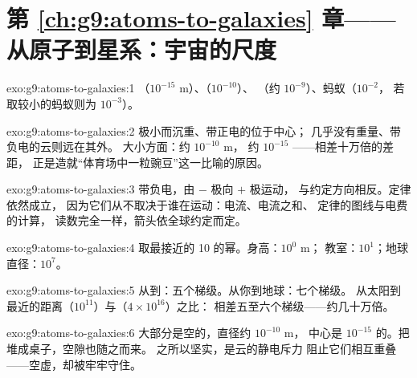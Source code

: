 \section*{第 \ref{ch:g9:atoms-to-galaxies} 章——从原子到星系：宇宙的尺度}

\begin{solution}{exo:g9:atoms-to-galaxies:1}
（$10^{-15}$ \unit{m}）、（$10^{-10}$）、
（约 $10^{-9}$）、蚂蚁（$10^{-2}$，
若取较小的蚂蚁则为 $10^{-3}$）。
\end{solution}

\begin{solution}{exo:g9:atoms-to-galaxies:2}
极小而沉重、带正电的位于中心；
几乎没有重量、带负电的云则远在其外。
大小方面：约 $10^{-10}$ \unit{m}，
约 $10^{-15}$ ——相差十万倍的差距，
正是造就“体育场中一粒豌豆”这一比喻的原因。
\end{solution}

\begin{solution}{exo:g9:atoms-to-galaxies:3}
带负电，由 $-$ 极向 $+$ 极运动，
与约定方向相反。定律依然成立，
因为它们从不取决于谁在运动：电流、电流之和、
定律的图线与电费的计算，
读数完全一样，箭头依全球约定而定。
\end{solution}

\begin{solution}{exo:g9:atoms-to-galaxies:4}
取最接近的 10 的幂。身高：$10^{0}$ \unit{m}；
教室：$10^{1}$；地球直径：$10^{7}$。
\end{solution}

\begin{solution}{exo:g9:atoms-to-galaxies:5}
从到：五个梯级。从你到地球：七个梯级。
从太阳到最近的距离（$10^{11}$）与（$4 \times 10^{16}$）之比：
相差五至六个梯级——约几十万倍。
\end{solution}

\begin{solution}{exo:g9:atoms-to-galaxies:6}
大部分是空的，直径约 $10^{-10}$ \unit{m}，
中心是 $10^{-15}$ 的。把堆成桌子，空隙也随之而来。
之所以坚实，是云的静电斥力
阻止它们相互重叠——空虚，却被牢牢守住。
\end{solution}

